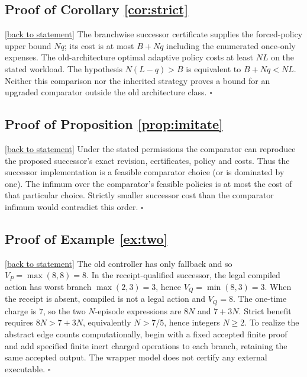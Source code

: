 \documentclass[11pt,letterpaper]{article}
\theoremstyle{definition}
\theoremstyle{remark}
\newcommand{\backlink}[1]{\hyperlink{claim:#1}{\footnotesize[back to statement]}}
\begin{document}
\hypertarget{proof:strict}{}\subsection*{Proof of Corollary \ref{cor:strict}}\backlink{strict}
The branchwise successor certificate supplies the forced-policy upper bound $Nq$; its cost is at most $B+Nq$ including the enumerated once-only expenses. The old-architecture optimal adaptive policy costs at least $NL$ on the stated workload. The hypothesis $N(L-q)>B$ is equivalent to $B+Nq<NL$. Neither this comparison nor the inherited strategy proves a bound for an upgraded comparator outside the old architecture class. $\square$

\hypertarget{proof:imitate}{}\subsection*{Proof of Proposition \ref{prop:imitate}}\backlink{imitate}
Under the stated permissions the comparator can reproduce the proposed successor's exact revision, certificates, policy and costs. Thus the successor implementation is a feasible comparator choice (or is dominated by one). The infimum over the comparator's feasible policies is at most the cost of that particular choice. Strictly smaller successor cost than the comparator infimum would contradict this order. $\square$

\hypertarget{proof:two}{}\subsection*{Proof of Example \ref{ex:two}}\backlink{two}
The old controller has only fallback and so $V_P=\max(8,8)=8$. In the receipt-qualified successor, the legal compiled action has worst branch $\max(2,3)=3$, hence $V_Q=\min(8,3)=3$. When the receipt is absent, compiled is not a legal action and $V_Q=8$. The one-time charge is $7$, so the two $N$-episode expressions are $8N$ and $7+3N$. Strict benefit requires $8N>7+3N$, equivalently $N>7/5$, hence integers $N\geq2$. To realize the abstract edge counts computationally, begin with a fixed accepted finite proof and add specified finite inert charged operations to each branch, retaining the same accepted output. The wrapper model does not certify any external executable. $\square$
\end{document}
